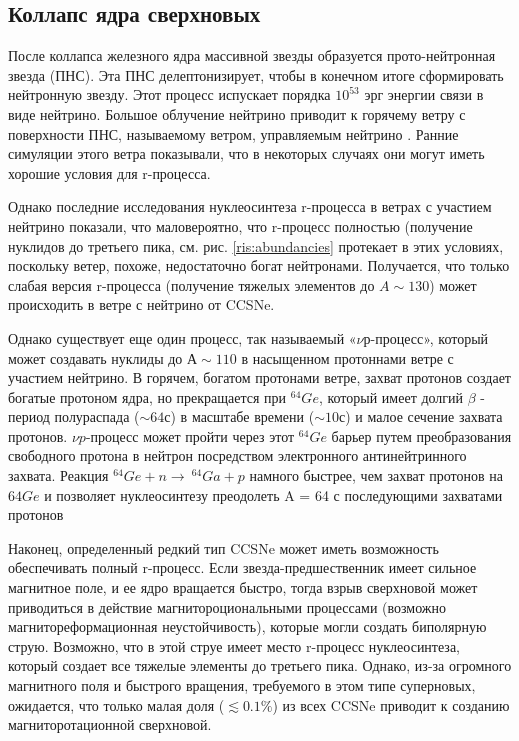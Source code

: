 \documentclass[14pt, a4paper]{article}
\numberwithin{figure}{section}
\numberwithin{equation}{section}
\begin{document}
\subsection{Коллапс ядра сверхновых}
После коллапса железного ядра массивной звезды образуется прото-нейтронная звезда (ПНС). Эта ПНС делептонизирует, чтобы в конечном итоге сформировать нейтронную звезду. Этот процесс испускает порядка $10^{53}$ эрг энергии связи в виде нейтрино. Большое облучение нейтрино приводит к горячему ветру с поверхности ПНС, называемому ветром, управляемым нейтрино \cite{neutrino}. Ранние симуляции этого ветра показывали, что в некоторых случаях они могут иметь хорошие условия для r-процесса.

Однако последние исследования нуклеосинтеза r-процесса в ветрах с участием нейтрино показали, что маловероятно, что r-процесс полностью (получение нуклидов до третьего пика, см. рис. \ref{ris:abundancies} протекает в этих условиях, поскольку ветер, похоже, недостаточно богат нейтронами. Получается, что только слабая версия r-процесса (получение тяжелых элементов до $A \sim 130$) может происходить в ветре с нейтрино от CCSNe.

Однако существует еще один процесс, так называемый «$\nu р$-процесс», который может создавать нуклиды до $А \sim 110$ в насыщенном протоннами ветре с участием нейтрино. В горячем, богатом протонами ветре, захват протонов создает богатые протоном ядра, но прекращается при $^{64}Ge$, который имеет долгий $\beta$ - период полураспада ($\sim 64$с) в масштабе времени ($\sim 10$с) и малое сечение захвата протонов. $\nu p$-процесс может пройти через этот $^{64}Ge$ барьер путем преобразования свободного протона в нейтрон посредством электронного антинейтринного захвата. Реакция $^{64}Ge + n \to \ ^{64}Ga + p$ намного быстрее, чем захват протонов на ${64}Ge$ и позволяет нуклеосинтезу преодолеть A = 64 с последующими захватами протонов

Наконец, определенный редкий тип CCSNe может иметь возможность обеспечивать полный r-процесс. Если звезда-предшественник имеет сильное магнитное поле, и ее ядро вращается быстро, тогда взрыв сверхновой может приводиться в действие магнитороциональными процессами (возможно магнитореформационная неустойчивость), которые могли создать биполярную струю. Возможно, что в этой струе имеет место r-процесс нуклеосинтеза, который создает все тяжелые элементы до третьего пика. Однако, из-за огромного магнитного поля и быстрого вращения, требуемого в этом типе суперновых, ожидается, что только малая доля ($\lesssim 0.1 \%$) из всех CCSNe приводит к созданию магниторотационной сверхновой.
\end{document}

